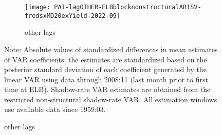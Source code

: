 \documentclass[12pt]{article}
\newlength{\picwid}
\begin{document}
\begin{figure}
\begin{center}
\begin{subfigure}[b]{\picwid}
\end{subfigure}
\quad
\begin{subfigure}[b]{\picwid}
\caption{other lags}
\label{subfig:exyield:pai:nonstructural:lagother}
\texttt{[image: PAI-lagOTHER-ELBblocknonstructuralAR1SV-fredsxMD20exYield-2022-09]}
\end{subfigure}
\end{center}
Note: Absolute values of standardized differences in mean estimates of VAR coefficients; the estimates are standardized based on the posterior standard deviation of each coefficient generated by the linear VAR using data through 2008:11 (last month prior to first time at ELB). Shadow-rate VAR estimates are obtained from the restricted non-structural shadow-rate VAR. All estimation windows use available data since 1959:03.
\end{figure}
\end{document}
